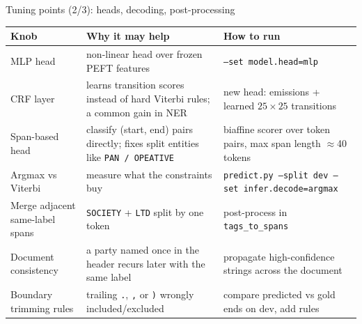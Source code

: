 \documentclass[aspectratio=169,11pt]{beamer}
\newcommand{\code}[1]{\texttt{\small #1}}
\begin{document}
\begin{frame}{Tuning points (2/3): heads, decoding, post-processing}
  \footnotesize
  \begin{tabularx}{\textwidth}{@{}>{\raggedright\arraybackslash}p{3.3cm}>{\raggedright\arraybackslash}X>{\raggedright\arraybackslash}p{5.2cm}@{}}
    \toprule
    Knob & Why it may help & How to run \\
    \midrule
    MLP head & non-linear head over frozen PEFT features & \code{--set model.head=mlp} \\
    CRF layer & learns transition scores instead of hard Viterbi rules; a common gain in NER & new head: emissions + learned $25\times25$ transitions \\
    Span-based head & classify (start, end) pairs directly; fixes split entities like \code{PAN / OPEATIVE} & biaffine scorer over token pairs, max span length $\approx$40 tokens \\
    Argmax vs Viterbi & measure what the constraints buy & \code{predict.py --split dev --set infer.decode=argmax} \\
    Merge adjacent same-label spans & \code{SOCIETY} + \code{LTD} split by one token & post-process in \code{tags\_to\_spans} \\
    Document consistency & a party named once in the header recurs later with the same label & propagate high-confidence strings across the document \\
    Boundary trimming rules & trailing \code{.}, \code{,} or \code{)} wrongly included/excluded & compare predicted vs gold ends on dev, add rules \\
    \bottomrule
  \end{tabularx}
\end{frame}
\end{document}
